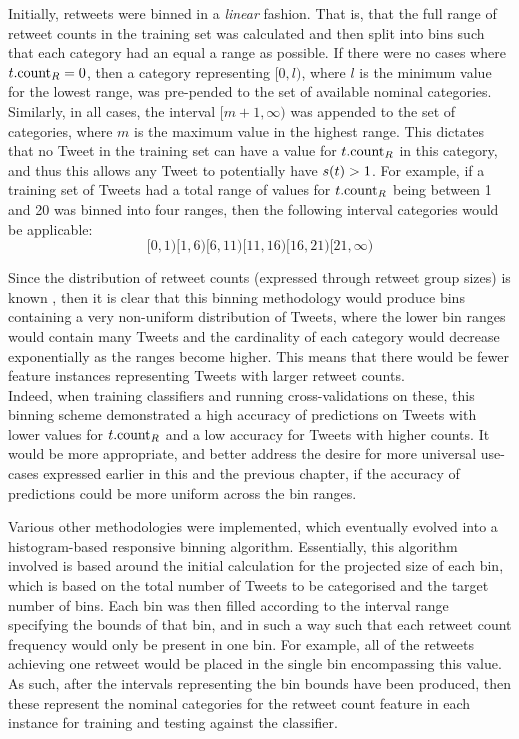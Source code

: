 Initially, retweets were binned in a \textit{linear} fashion. That is, that the full range of retweet counts in the training set was calculated and then split into bins such that each category had an equal a range as possible. If there were no cases where $t.\textrm{count}_R = 0$, then a category representing $[0,l)$, where $l$ is the minimum value for the lowest range, was pre-pended to the set of available nominal categories. Similarly, in all cases, the interval $[m+1,\infty)$ was appended to the set of categories, where $m$ is the maximum value in the highest range. This dictates that no Tweet in the training set can have a value for $t.\textrm{count}_R$ in this category, and thus this allows any Tweet to potentially have $s(t) > 1$. For example, if a training set of Tweets had a total range of values for $t.\textrm{count}_R$ being between 1 and 20 was binned into four ranges, then the following interval categories would be applicable:
\[
    [0,1) [1,6) [6,11) [11,16) [16,21) [21,\infty)
\]

Since the distribution of retweet counts (expressed through retweet group sizes) is known \cite{webberley11}, then it is clear that this binning methodology would produce bins containing a very non-uniform distribution of Tweets, where the lower bin ranges would contain many Tweets and the cardinality of each category would decrease exponentially as the ranges become higher. This means that there would be fewer feature instances representing Tweets with larger retweet counts.\\
 Indeed, when training classifiers and running cross-validations on these, this binning scheme demonstrated a high accuracy of predictions on Tweets with lower values for $t.\textrm{count}_R$ and a low accuracy for Tweets with higher counts. It would be more appropriate, and better address the desire for more universal use-cases expressed earlier in this and the previous chapter, if the accuracy of predictions could be more uniform across the bin ranges.

Various other methodologies were implemented, which eventually evolved into a histogram-based responsive  binning algorithm. Essentially, this algorithm involved is based around the initial calculation for the projected size of each bin, which is based on the total number of Tweets to be categorised and the target number of bins. Each bin was then filled according to the interval range specifying the bounds of that bin, and in such a way such that each retweet count frequency would only be present in one bin. For example, all of the retweets achieving one retweet would be placed in the single bin encompassing this value.\\
As such, after the intervals representing the bin bounds have been produced, then these represent the nominal categories for the retweet count feature in each instance for training and testing against the classifier.



